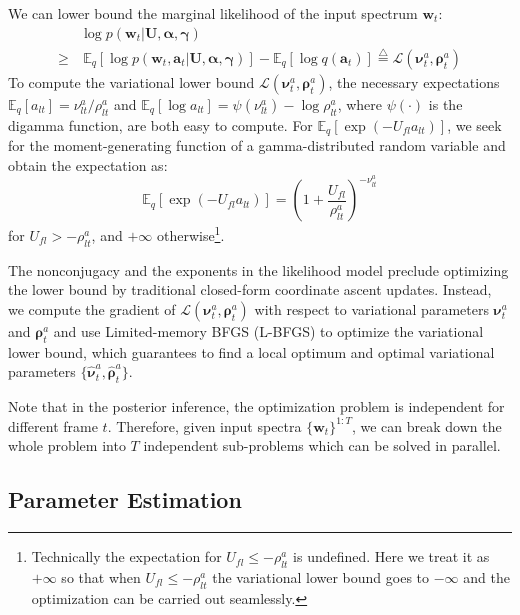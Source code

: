 \documentclass{article} %
\begin{document}
We can lower bound the marginal likelihood of the input spectrum $\bm{w}_t$: 
\begin{align} \label{eq:lbound}
&\log p(\bm{w}_t | \mathbf{U}, \bm{\alpha}, \bm{\gamma})\nonumber \\ 
\geq &~\mathbb{E}_q [\log p(\bm{w}_t, \bm{a}_t| \mathbf{U}, \bm{\alpha}, \bm{\gamma})] - \mathbb{E}_q [\log q(\bm{a}_t)] \overset{\bigtriangleup}{=} \mathcal{L}(\bm{\nu}^a_t, \bm{\rho}^a_t)
\end{align}
To compute the variational lower bound $\mathcal{L}(\bm{\nu}^a_t, \bm{\rho}^a_t)$, the necessary expectations $\mathbb{E}_q[a_{lt}] = \nu_{lt}^a / \rho_{lt}^a$ and $\mathbb{E}_q[\log a_{lt}] =  \psi(\nu_{lt}^a) - \log \rho_{lt}^a$, where $\psi(\cdot)$ is the digamma function, are both easy to compute. For $\mathbb{E}_q[\exp(-U_{fl} a_{lt})]$, we seek for the moment-generating function of a gamma-distributed random variable and obtain the expectation as:
\begin{equation}
\mathbb{E}_q[\exp(-U_{fl} a_{lt})] = \left(1 + \textstyle{\frac{U_{fl}}{\rho^a_{lt}}}\right)^{-\nu_{lt}^a}
\end{equation}
for $U_{fl} > -\rho_{lt}^a$, and $+\infty$ otherwise\footnote{Technically the expectation for $U_{fl} \leq -\rho_{lt}^a$ is undefined. Here we treat it as $+\infty$ so that when $U_{fl} \le -\rho_{lt}^a$ the variational lower bound goes to $-\infty$ and the optimization can be carried out seamlessly.}.

The nonconjugacy and the exponents in the likelihood model preclude optimizing the lower bound by traditional closed-form coordinate ascent updates. Instead, we compute the gradient of $\mathcal{L}(\bm{\nu}^a_t, \bm{\rho}^a_t)$ with respect to variational parameters $\bm{\nu}_{t}^a$ and $\bm{\rho}_{t}^a$ and use Limited-memory BFGS (L-BFGS) to optimize the variational lower bound, which guarantees to find a local optimum and optimal variational parameters $\{\hat{\bm{\nu}}_t^{a}, \hat{\bm{\rho}}_t^{a}\}$. 

Note that in the posterior inference, the optimization problem is independent for different frame $t$. Therefore, given input spectra $\{\bm{w}_t\}^{1:T}$, we can break down the whole problem into $T$ independent sub-problems which can be solved in parallel. 

\subsection{Parameter Estimation}
\end{document}
